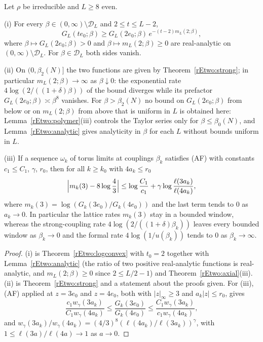 \begin{proposition}\label{rEtwo:degenerate}
Let $\rho$ be irreducible and $L\ge8$ even.

\textup{(i)} For every $\beta\in(0,\infty)\setminus\mathcal D_L$ and
$2\le t\le L-2$,
\[
G_L(te_0;\beta)\ge G_L(2e_0;\beta)\,e^{-(t-2)m_L(2;\beta)},
\]
where $\beta\mapsto G_L(2e_0;\beta)>0$ and $\beta\mapsto
m_L(2;\beta)\ge0$ are real-analytic on $(0,\infty)\setminus\mathcal D_L$.
For $\beta\in\mathcal D_L$ both sides vanish.

\textup{(ii)} On $(0,\beta_2(N)]$ the two functions are given by
Theorem~\ref{rEtwo:strong}; in particular $m_L(2;\beta)\to\infty$ as
$\beta\downarrow0$: the exponential rate $4\log(2/((1+\delta)\beta))$ of
the bound diverges while its prefactor $G_L(2e_0;\beta)\asymp\beta^8$
vanishes. For $\beta>\beta_2(N)$ no bound on $G_L(2e_0;\beta)$ from below
or on $m_L(2;\beta)$ from above that is uniform in $L$ is obtained here:
Lemma~\ref{rEtwo:polymer}(iii) controls the Taylor series only for $\beta
\le\beta_0(N)$, and Lemma~\ref{rEtwo:analytic} gives analyticity in
$\beta$ for each $L$ without bounds uniform in $L$.

\textup{(iii)} If a sequence $\omega_k$ of torus limits at couplings
$\beta_k$ satisfies (AF) with constants $c_1\le C_1$, $\gamma$, $r_0$, then
for all $k\ge k_0$ with $4a_k\le r_0$
\[
\Bigl|m_k(3)-8\log\frac43\Bigr|\le\log\frac{C_1}{c_1}+\gamma\log
\frac{\ell(3a_k)}{\ell(4a_k)} ,
\]
where $m_k(3)=\log(G_k(3e_0)/G_k(4e_0))$ and the last term tends to $0$
as $a_k\to0$. In particular the lattice rates $m_k(3)$ stay in a bounded
window, whereas the strong-coupling rate $4\log(2/((1+\delta)\beta_k))$
leaves every bounded window as $\beta_k\to0$ and the formal rate
$4\log(1/u(\beta_k))$ tends to $0$ as $\beta_k\to\infty$.
\end{proposition}

\begin{proof}
(i) is Theorem~\ref{rEtwo:logconvex} with $t_0=2$ together with
Lemma~\ref{rEtwo:analytic} (the ratio of two positive real-analytic
functions is real-analytic, and $m_L(2;\beta)\ge0$ since $2\le L/2-1$) and
Theorem~\ref{rEtwo:axial}(iii). (ii) is Theorem~\ref{rEtwo:strong} and a
statement about the proofs given. For (iii), (AF) applied at $z=3e_0$ and
$z=4e_0$, both with $|z|_\infty\ge3$ and $a_k|z|\le r_0$, gives
\[
\frac{c_1w_\gamma(3a_k)}{C_1w_\gamma(4a_k)}\le\frac{G_k(3e_0)}{G_k(4e_0)}
\le\frac{C_1w_\gamma(3a_k)}{c_1w_\gamma(4a_k)},
\]
and $w_\gamma(3a_k)/w_\gamma(4a_k)=(4/3)^8(\ell(4a_k)/\ell(3a_k))^\gamma$,
with $1\le\ell(3a)/\ell(4a)\to1$ as $a\to0$.
\end{proof}


